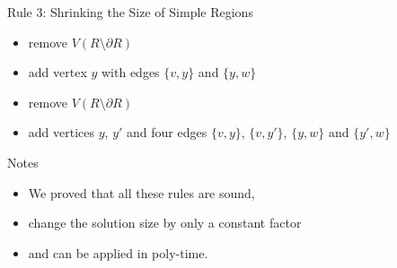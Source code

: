 \begin{frame}[c]{Rule 3: Shrinking the Size of Simple Regions}

    \begin{caseof}

            \begin{itemize}
                    \item remove $V(R\setminus\partial R)$
                    \item add vertex $y$ with edges $\{v, y\}$ and $\{y, w\}$
            \end{itemize}
        {\bfseries

            \begin{itemize}
                    \item remove $V(R\setminus\partial R)$
                    \item add vertices $y$, $y'$ and four edges $\{v,y\}$, $\{v, y'\}$, $\{y, w\}$ and $\{y', w\}$
            \end{itemize}
        }
        \end{caseof}

    \begin{figure}[!ht]
    \end{figure}
\end{frame}


\begin{frame}[c]{Notes}
    \begin{itemize}
        \pause \item We proved that all these rules are sound,
        \pause \item change the solution size by only a constant factor
        \pause \item and can be applied in poly-time.
    \end{itemize}
\end{frame}

